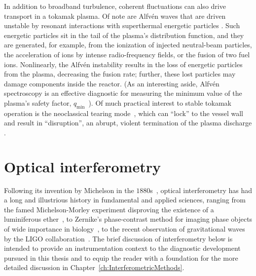 In addition to broadband turbulence,
coherent fluctuations can also drive transport in a tokamak plasma.
Of note are Alfv\'{e}n waves that are driven unstable
by resonant interactions with superthermal energetic particles
\cite{wesson,heidbrink_pp08}.
Such energetic particles sit in the tail
of the plasma's distribution function, and
they are generated, for example, from
the ionization of injected neutral-beam particles,
the acceleration of ions by intense radio-frequency fields, or
the fusion of two fuel ions.
Nonlinearly, the Alfv\'{e}n instability
results in the loss of energetic particles from the plasma,
decreasing the fusion rate;
further, these lost particles may damage components inside the reactor.
(As an interesting aside, Alfv\'{e}n spectroscopy is an effective diagnostic
for measuring the minimum value of the plasma's safety factor,
$q_{\text{min}}$~\cite{wesson,edlund_prl09,breizman_pp05}).
Of much practical interest to stable tokamak operation
is the neoclassical tearing mode~\cite[Sec.~7.3]{wesson},
which can ``lock'' to the vessel wall~\cite[Sec.~7.10]{wesson}
and result in ``disruption'',
an abrupt, violent termination of the plasma discharge
\cite[Sec.~7.7-7.9]{wesson}.


\section{Optical interferometry}
\label{sec:Introduction:OpticalInterferometry}
Following its invention by Michelson
in the $1880$s~\cite{nobel_prize_michelson},
optical interferometry has had a long and illustrious history
in fundamental and applied sciences, ranging from
the famed Michelson-Morley experiment
disproving the existence of a luminiferous ether~\cite{michelson_ajs1887},
to Zernike's phase-contrast method for imaging phase objects
of wide importance in biology~\cite{nobel_prize_zernike},
to the recent observation of gravitational waves
by the LIGO collaboration~\cite{ligo_prl16,nobel_prize_ligo}.
The brief discussion of interferometry below is intended
to provide an instrumentation context
to the diagnostic development pursued in this thesis and
to equip the reader with a foundation
for the more detailed discussion in
Chapter~\ref{ch:InterferometricMethods}.


